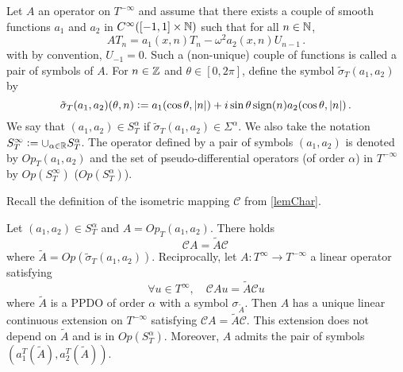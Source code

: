 \documentclass[a4paper]{article}
\begin{document}
\begin{Def}
	Let $A$ an operator on $T^{-\infty}$ and assume that there exists a couple of smooth functions $a_1$ and $a_2$ in $C^{\infty}([-1,1]\times \mathbb{N})$ such that for all $n \in \mathbb{N}$,
	\begin{equation}
	AT_n = a_1(x,n) T_n - \omega^2 a_2(x,n) U_{n-1}\,.
	\label{defOpTs}
	\end{equation}
	with by convention, $U_{-1} = 0$. Such a (non-unique) couple of functions is called a pair of symbols of $A$. For $n\in \mathbb{Z}$ and $\theta \in [0,2\pi]$, define the symbol $\tilde{\sigma}_T(a_1,a_2)$ by
	\[\tilde{\sigma}_T(a_1,a_2)(\theta,n) \mathrel{\mathop:}= a_1(\cos\theta,\left\lvert n \right\rvert) + i \sin\theta\,\text{sign}(n) a_2(\cos\theta,\left\lvert n \right\rvert)\,.\]
	We say that $(a_1,a_2) \in S^\alpha_T$ if $\tilde{\sigma}_T(a_1,a_2) \in \Sigma^\alpha$. We also take the notation $S^{\infty}_T \mathrel{\mathop:}= \cup_{\alpha \in \mathbb{R}} S^\alpha_T$. The operator defined by a pair of symbols $(a_1,a_2)$ is denoted by $\textit{Op}_T(a_1,a_2)$ and the set of pseudo-differential operators (of order $\alpha$) in $T^{-\infty}$ by $\textit{Op}(S^\infty_T)$ ($\textit{Op}(S^\alpha_T)$).
\end{Def} 
\noindent Recall the definition of the isometric mapping $\mathcal{C}$ from \autoref{lemChar}.
\begin{The}
	\label{PDOTs}
	Let $(a_1,a_2) \in S^\alpha_T$ and $A = \textit{Op}_T(a_1,a_2)$.  There holds
	\[\mathcal{C}A = \tilde{A}\mathcal{C}\,\]
	where $\tilde{A} = \textit{Op}(\tilde{\sigma}_T(a_1,a_2))$. 
	Reciprocally, let $A : T^{\infty} \to T^{-\infty}$ a linear operator satisfying
	\[\forall u \in T^{\infty},\quad \mathcal{C}Au = \tilde{A}\mathcal{C}u\] 
	where $\tilde{A}$ is a PPDO of order $\alpha$ with a symbol $\sigma_{\tilde{A}}$. Then $A$ has a unique linear continuous extension on $T^{-\infty}$ satisfying $\mathcal{C}A = \tilde{A} \mathcal{C}$. This extension does not depend on $\tilde{A}$ and is in $\textit{Op}(S^\alpha_T)$. Moreover, $A$ admits the pair of symbols $(a_1^T(\tilde{A}),a_2^T(\tilde{A}))$.
\end{The}
\end{document}
